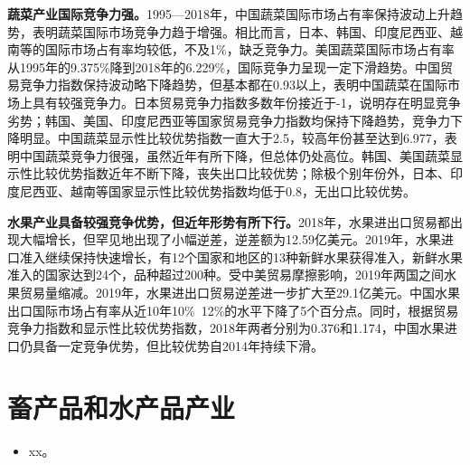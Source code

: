 \documentclass{progbookcn}
\begin{document}
\textbf{蔬菜产业国际竞争力强。}1995—2018年，中国蔬菜国际市场占有率保持波动上升趋势，表明蔬菜国际市场竞争力趋于增强。相比而言，日本、韩国、印度尼西亚、越南等的国际市场占有率均较低，不及1\%，缺乏竞争力。美国蔬菜国际市场占有率从1995年的9.375\%降到2018年的6.229\%，国际竞争力呈现一定下滑趋势。中国贸易竞争力指数保持波动略下降趋势，但基本都在0.93以上，表明中国蔬菜在国际市场上具有较强竞争力。日本贸易竞争力指数多数年份接近于-1，说明存在明显竞争劣势；韩国、美国、印度尼西亚等国家贸易竞争力指数均保持下降趋势，竞争力下降明显。中国蔬菜显示性比较优势指数一直大于2.5，较高年份甚至达到6.977，表明中国蔬菜竞争力很强，虽然近年有所下降，但总体仍处高位。韩国、美国蔬菜显示性比较优势指数近年不断下降，丧失出口比较优势；除极个别年份外，日本、印度尼西亚、越南等国家显示性比较优势指数均低于0.8，无出口比较优势。

\textbf{水果产业具备较强竞争优势，但近年形势有所下行。}2018年，水果进出口贸易都出现大幅增长，但罕见地出现了小幅逆差，逆差额为12.59亿美元。2019年，水果进口准入继续保持快速增长，有12个国家和地区的13种新鲜水果获得准入，新鲜水果准入的国家达到24个，品种超过200种。受中美贸易摩擦影响，2019年两国之间水果贸易量缩减。2019年，水果进出口贸易逆差进一步扩大至29.1亿美元。中国水果出口国际市场占有率从近10年10\%~12\%的水平下降了5个百分点。同时，根据贸易竞争力指数和显示性比较优势指数，2018年两者分别为0.376和1.174，中国水果进口仍具备一定竞争优势，但比较优势自2014年持续下滑。


\chapter{畜产品和水产品产业}
\begin{titledbox}{}
\begin{itemize}
  \item xx。
 \end{itemize}
\end{titledbox}
\end{document}
